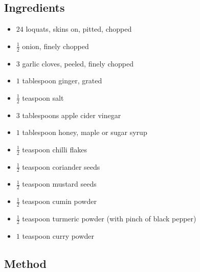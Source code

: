 \documentclass[11pt,a4paper]{article}
\begin{document}
\subsection*{Ingredients}

\begin{multicols}{2}

\begin{itemize}
  \item $ 24 $ loquats, skins on, pitted, chopped
  \item $ \frac{1}{2} $ onion, finely chopped
  \item $ 3 $ garlic cloves, peeled, finely chopped
  \item $ 1 $ tablespoon ginger, grated
  \item $ \frac{1}{2} $ teaspoon salt
  \item $ 3 $ tablespoons apple cider vinegar
  \item $ 1 $ tablespoon honey, maple  or sugar syrup
\end{itemize}

\columnbreak{}

\begin{itemize}
  \item $ \frac{1}{2} $ teaspoon chilli flakes
  \item $ \frac{1}{2} $ teaspoon coriander seeds
  \item $ \frac{1}{2} $ teaspoon mustard seeds
  \item $ \frac{1}{2} $ teaspoon cumin powder
  \item $ \frac{1}{2} $ teaspoon turmeric powder (with pinch of black pepper)
  \item $ 1 $ teaspoon curry powder
\end{itemize}

\end{multicols}

\medskip

\subsection*{Method}
\end{document}
